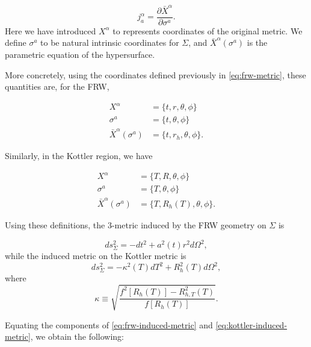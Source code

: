 \begin{equation}
  j^{\alpha}_{a} = \frac{\partial \bar{X}^{\alpha}}{\partial \sigma^a}.
  \label{eq:j-defn}
\end{equation}
Here we have introduced $X^{\alpha}$ to represents coordinates of the original metric. We define $\sigma^a$ to be natural intrinsic coordinates for $\Sigma$, and $\bar{X}^{\alpha}(\sigma^a)$ is the parametric equation of the hypersurface. 

More concretely, using the coordinates defined previously in \autoref{eq:frw-metric}, these quantities are, for the FRW, 

\begin{subequations}
  \begin{align}
    X^{\alpha} &= \{ t, r, \theta, \phi \} \\
    \sigma^a &= \{ t, \theta, \phi \} \\
    \bar{X}^{\alpha}(\sigma^a) &= \{ t, r_h, \theta, \phi\}.
  \end{align}
\end{subequations}

Similarly, in the Kottler region, we have 

\begin{subequations}
  \begin{align}
    X^{\alpha} &= \{ T, R, \theta, \phi \} \\
    \sigma^a &= \{ T, \theta, \phi \} \\
    \bar{X}^{\alpha}(\sigma^a) &= \{ T, R_h(T), \theta, \phi\}.
  \end{align}
\end{subequations}

Using these definitions, the 3-metric induced by the FRW geometry on $\Sigma$ is

\begin{equation}
  ds^2_{\Sigma} = -dt^2 + a^2(t)r^2 d \Omega^2,
  \label{eq:frw-induced-metric}
\end{equation}
while the induced metric on the Kottler metric is
\begin{equation}
  ds_{\Sigma}^2 = -\kappa^2(T)dT^2 + R_h^2(T) d \Omega^2,
  \label{eq:kottler-induced-metric}
\end{equation}
where
\begin{equation}
  \kappa \equiv \sqrt{\frac{f^2[R_h(T)] - R_{h,T}^2(T)}{f[R_h(T)]}}.
  \label{eq:kottler-kappa}
\end{equation}

Equating the components of \autoref{eq:frw-induced-metric} and \autoref{eq:kottler-induced-metric}, we obtain the following:

